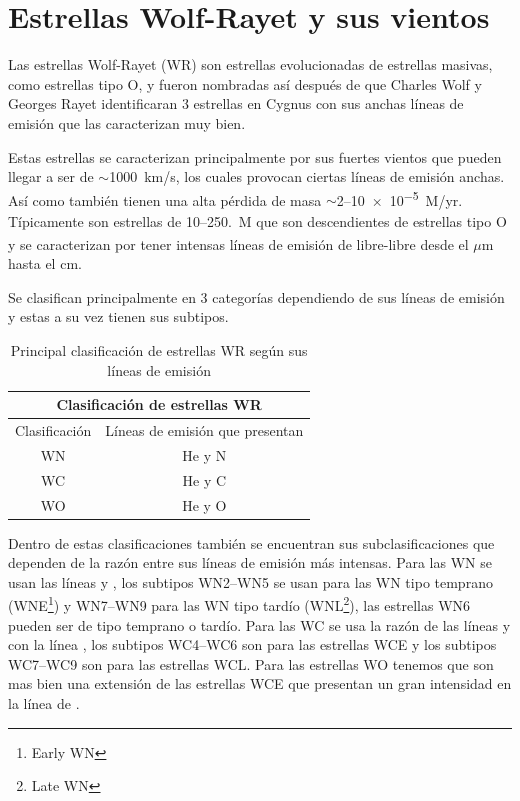 \documentclass{book}
\begin{document}
\section{Estrellas Wolf-Rayet y sus vientos}

Las estrellas Wolf-Rayet (WR) son estrellas evolucionadas de estrellas masivas, como estrellas tipo O, y fueron nombradas así después de que Charles Wolf y Georges Rayet identificaran 3 estrellas en Cygnus con sus  anchas líneas de emisión que las caracterizan muy bien. 

Estas estrellas se caracterizan principalmente por sus fuertes vientos que pueden llegar a ser de $\sim$\SI{1000}{km/s}, los cuales provocan ciertas líneas de emisión anchas. Así como también tienen una alta pérdida de masa $\sim$2--\SI{10e-5}{M_\odot/yr}. Típicamente son estrellas de 10--25\SI{.}{M_\odot} que son descendientes de estrellas tipo O y se caracterizan por tener intensas líneas de emisión de libre-libre desde el $\mu$m hasta el cm.

Se clasifican principalmente en 3 categorías dependiendo de sus líneas de emisión y estas a su vez tienen sus subtipos.

\begin{table}[t]
    \begin{center}
        \begin{tabular}{|c|c|}
        \hline
        \multicolumn{2}{|c|}{Clasificación de estrellas WR} \\ \hline
        Clasificación    & Líneas de emisión que presentan\\ \hline
        WN     & He y N\\
        WC & He y C\\
        WO & He y O \\ \hline
        \end{tabular}
    \caption{Principal clasificación de estrellas WR  según sus líneas de emisión}
    \label{tab:WR}
    \end{center}
\end{table}

Dentro de estas clasificaciones también  se encuentran sus subclasificaciones que dependen de la razón entre sus líneas de emisión más intensas. Para las WN se usan las líneas  y , los subtipos WN2--WN5 se usan para las WN tipo temprano (WNE\footnote{Early WN}) y WN7--WN9 para las WN tipo tardío (WNL\footnote{Late WN}), las estrellas WN6 pueden ser de tipo temprano o tardío. Para las WC se usa la razón de las líneas  y  con la línea , los subtipos WC4--WC6 son para las estrellas WCE y los subtipos WC7--WC9 son para las estrellas WCL. Para las estrellas WO tenemos que son mas bien una extensión de las estrellas WCE que presentan un gran intensidad en la línea de . 
\end{document}
